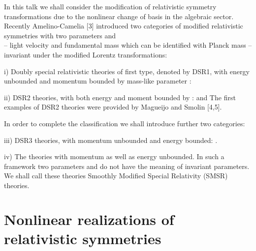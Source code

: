 \documentclass[a4paper,12pt]{article} \usepackage{times}
\begin{document}
In this talk we shall consider the modification of relativistic
symmetry transformations due to the nonlinear change of basis in
the algebraic sector. Recently Amelino-Camelia [3] introduced two
categories of modified relativistic symmetries with two parameters
\coordHE{} and \myHighlight{$\kappa$}\coordHE{}\\-- light velocity \coordHE{} and fundamental mass
\myHighlight{$\kappa$}\coordHE{} which can be identified with Planck mass -- invariant
under the modified Lorentz transformations:
\begin{description}
\item{i)} Doubly special relativistic theories of first type, denoted by
DSR1, with energy \coordHE{} unbounded and momentum \coordHE{} 
bounded by
mass-like parameter \myHighlight{$\kappa$}\coordHE{}:  \coordHE{} \item{ii)}
DSR2 theories, with both energy and moment bounded by 
\myHighlight{$\kappa$}\coordHE{}: \coordHE{} and   \coordHE{} The first examples of
DSR2 theories were provided by Magueijo and Smolin [4,5].
\end{description} In  order to complete the classification we shall
introduce further two categories:

\begin{description}
\item{iii)}  DSR3 theories, with momentum unbounded and energy
bounded: \coordHE{}.
\item{iv)} The theories with momentum as well as energy 
unbounded. In such
a framework two parameters \coordHE{} and \myHighlight{$\kappa$}\coordHE{} do not have the 
meaning of
invariant parameters. We shall call these theories Smoothly 
Modified
Special Relativity (SMSR) theories. \end{description}


\section{Nonlinear realizations of relativistic symmetries}
\end{document}
